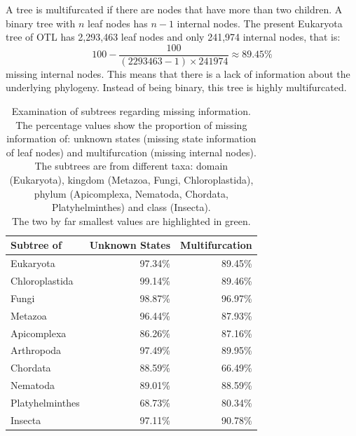     A tree is multifurcated if there are nodes that have more than two children. A binary tree with 
      $n$ leaf nodes has $n-1$ internal nodes. The present Eukaryota tree of OTL has 2,293,463 leaf 
      nodes and only 241,974 internal nodes, that is:
    $$100-\frac{100}{(2293463-1) \times 241974} \approx 89.45\%$$
      missing internal nodes. This means that there is a lack of information about the underlying 
      phylogeny. Instead of being binary, this tree is highly multifurcated. \\
    \begin{table}[h!]
      \begin{center}
        \begin{tabular}{ |l||r|r| }
          \hline
          \bfseries Subtree of & \bfseries Unknown States & \bfseries Multifurcation \\ 
          \hline \hline
          Eukaryota       & 97.34\%  & 89.45\% \\
          \hline \hline
          Chloroplastida  & 99.14\%  & 89.46\% \\ \hline
          Fungi           & 98.87\%  & 96.97\% \\ \hline
          Metazoa         & 96.44\%  & 87.93\% \\
          \hline \hline
          Apicomplexa     & 86.26\%  & 87.16\% \\ \hline
          Arthropoda      & 97.49\%  & 89.95\% \\ \hline
          Chordata        & 88.59\%  & {\cellcolor{green!50}}66.49\% \\ \hline
          Nematoda        & 89.01\%  & 88.59\% \\ \hline
          Platyhelminthes & {\cellcolor{green!50}}68.73\%  & 80.34\% \\
          \hline \hline            
          Insecta         & 97.11\%  & 90.78\% \\
          \hline  
        \end{tabular}
      \end{center}
      \caption{Examination of subtrees regarding missing information. \\
        The percentage values show the proportion of missing information of: unknown states (missing 
          state information of leaf nodes) and multifurcation (missing internal nodes). \\
        The subtrees are from different taxa: domain (Eukaryota), kingdom (Metazoa, Fungi, 
          Chloroplastida), phylum (Apicomplexa, Nematoda, Chordata, Platyhelminthes) and class 
          (Insecta). \\
        The two by far smallest values are highlighted in green.} 
      \label{table:percentage loss information subtrees} 
    \end{table} \\

